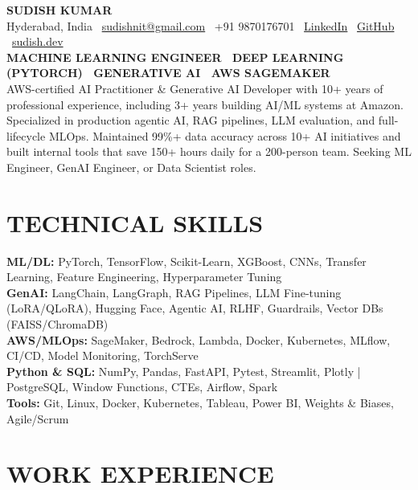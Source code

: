 \documentclass[10.5pt,a4paper]{article}
\begin{document}
\begin{center}
{\LARGE\bfseries SUDISH KUMAR}\\[5pt]
{\small\color{subtext}
Hyderabad, India \textbar\ \href{mailto:sudishnit@gmail.com}{sudishnit@gmail.com} \textbar\ +91 9870176701 \textbar\ \href{https://linkedin.com/in/simplysudish}{LinkedIn} \textbar\ \href{https://github.com/Sudish007}{GitHub} \textbar\ \href{https://sudish.dev}{sudish.dev}}\\[6pt]
{\small\bfseries\color{accent} MACHINE LEARNING ENGINEER \textbar\ DEEP LEARNING (PYTORCH) \textbar\ GENERATIVE AI \textbar\ AWS SAGEMAKER}\\[6pt]
{\small\color{subtext} AWS-certified AI Practitioner \& Generative AI Developer with 10+ years of professional experience, including 3+ years building AI/ML systems at Amazon. Specialized in production agentic AI, RAG pipelines, LLM evaluation, and full-lifecycle MLOps. Maintained 99\%+ data accuracy across 10+ AI initiatives and built internal tools that save 150+ hours daily for a 200-person team. Seeking ML Engineer, GenAI Engineer, or Data Scientist roles.}
\end{center}

\section*{TECHNICAL SKILLS}
\textbf{ML/DL:} PyTorch, TensorFlow, Scikit-Learn, XGBoost, CNNs, Transfer Learning, Feature Engineering, Hyperparameter Tuning\\[3pt]
\textbf{GenAI:} LangChain, LangGraph, RAG Pipelines, LLM Fine-tuning (LoRA/QLoRA), Hugging Face, Agentic AI, RLHF, Guardrails, Vector DBs (FAISS/ChromaDB)\\[3pt]
\textbf{AWS/MLOps:} SageMaker, Bedrock, Lambda, Docker, Kubernetes, MLflow, CI/CD, Model Monitoring, TorchServe\\[3pt]
\textbf{Python \& SQL:} NumPy, Pandas, FastAPI, Pytest, Streamlit, Plotly | PostgreSQL, Window Functions, CTEs, Airflow, Spark\\[3pt]
\textbf{Tools:} Git, Linux, Docker, Kubernetes, Tableau, Power BI, Weights \& Biases, Agile/Scrum

\section*{WORK EXPERIENCE}
\end{document}
